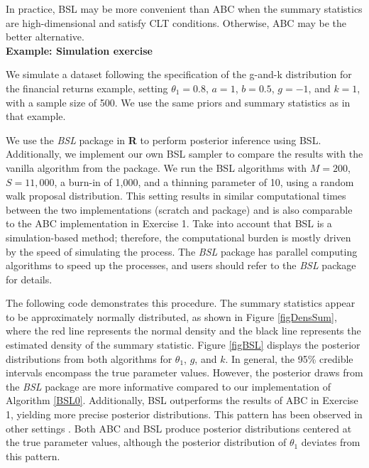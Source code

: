In practice, BSL may be more convenient than ABC when the summary statistics are high-dimensional and satisfy CLT conditions. Otherwise, ABC may be the better alternative.\\    

\textbf{Example: Simulation exercise}

We simulate a dataset following the specification of the g-and-k distribution for the financial returns example, setting $\theta_1 = 0.8$, $a = 1$, $b = 0.5$, $g = -1$, and $k = 1$, with a sample size of 500. We use the same priors and summary statistics as in that example.

We use the \textit{BSL} package in \textbf{R} to perform posterior inference using BSL. Additionally, we implement our own BSL sampler to compare the results with the vanilla algorithm from the package. We run the BSL algorithms with $M=200$, $S=11,000$, a burn-in of 1,000, and a thinning parameter of 10, using a random walk proposal distribution. This setting results in similar computational times between the two implementations (scratch and package) and is also comparable to the ABC implementation in Exercise 1. Take into account that BSL is a simulation-based method; therefore, the computational burden is mostly driven by the speed of simulating the process. The \textit{BSL} package has parallel computing algorithms to speed up the processes, and users should refer to the \textit{BSL} package for details.

The following code demonstrates this procedure. The summary statistics appear to be approximately normally distributed, as shown in Figure \ref{figDensSum}, where the red line represents the normal density and the black line represents the estimated density of the summary statistic. Figure \ref{figBSL} displays the posterior distributions from both algorithms for $\theta_1$, $g$, and $k$. In general, the 95\% credible intervals encompass the true parameter values. However, the posterior draws from the \textit{BSL} package are more informative compared to our implementation of Algorithm \ref{BSL0}. Additionally, BSL outperforms the results of ABC in Exercise 1, yielding more precise posterior distributions. This pattern has been observed in other settings \cite{drovandi2022comparison,martin2024approximating}. Both ABC and BSL produce posterior distributions centered at the true parameter values, although the posterior distribution of $\theta_1$ deviates from this pattern.

